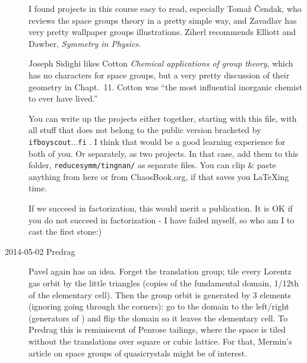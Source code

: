 \documentclass[pre,preprint,groupedaddress,showpacs,showkeys]{revtex4}
\begin{document}
\begin{description}
I found projects in  {this
course} easy to read, especially Toma\v{z} \v{C}endak, who reviews the
space groups theory in a pretty simple way, and Zavadlav has very pretty
wallpaper groups illustrations. Ziherl recommends Elliott and  Dawber,
{\em Symmetry in Physics}.

Joseph Sidighi likes Cotton {\em Chemical applications of
group theory}, which has no characters for space groups, but a very
pretty discussion of their geometry in Chapt.~11. Cotton was ``the most
influential inorganic chemist to ever have lived.''

You can write up the projects either together, starting with this file,
with all stuff that does not belong to the public version
bracketed by \texttt{ifboyscout}...\texttt{fi} . I think that would be a good
learning experience for both of you. Or separately, as two projects.
In that case, add them to this folder, \texttt{reducesymm/tingnan/} as
separate files. You can clip \& paste anything from here or from
ChaosBook.org, if that saves you LaTeXing time.

If we succeed in factorization, this would merit a publication.
It is OK if you do not succeed in factorization - I have failed myself, so
who am I to cast the first stone:)

\item[2014-05-02 Predrag]
Pavel again has an idea. Forget the translation group; tile every Lorentz
gas orbit by the little triangles (copies of the fundamental domain,
1/12th of the elementary cell). Then the group orbit is generated by 3
elements (ignoring going through the corners): go to the domain to the
left/right (generators of ) and flip the domain so it leaves the
elementary cell. To Predrag this is reminiscent of Penrose tailings,
where the space is tiled without the translations over square or cubic
lattice. For that, Mermin's article on space groups of
quasicrystals might be of interest.


\end{description}
\end{document}
